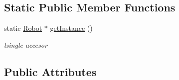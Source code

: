 \subsection*{Static Public Member Functions}
\begin{DoxyCompactItemize}
\item 
static \hyperlink{classRobot}{Robot} $\ast$ \hyperlink{classRobot_ac6f19dc31b435f8a2d43944ba49286d0}{get\-Instance} ()
\begin{DoxyCompactList}\small\item\em lsingle accesor \end{DoxyCompactList}\end{DoxyCompactItemize}
\subsection*{Public Attributes}
